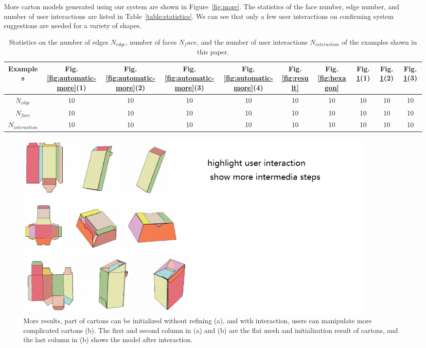 More carton models generated using our system are shown in Figure~\ref{fig:more}.
%
The statistics of the face number, edge number, and number of user interactions are listed in Table~\ref{table:statistics}. 
We can see that only a few user interactions on confirming system suggestions are needed for a variety of shapes.


\begin{table}
	\centering
	\caption{Statistics on the number of edges $N_{edge}$, number of faces $N_face$, and the number of user interactions $N_{interaction}$ of the examples shown in this paper.}
	\begin{tabular}{c|ccccccccc}
		\hline
		Examples & Fig.\ref{fig:automatic-more}(1) & Fig.\ref{fig:automatic-more}(2) &  Fig.\ref{fig:automatic-more}(3) & Fig.\ref{fig:automatic-more}(4) & Fig.\ref{fig:result} & Fig.\ref{fig:hexagon} & Fig.\ref{fig:result-more}(1) & Fig.\ref{fig:result-more}(2)& Fig.\ref{fig:result-more}(3)\\
		\hline
		$N_{edge}$ & 10 & 10 & 10 & 10 & 10 & 10 & 10 & 10 & 10 \\
		$N_{face}$  & 10 & 10 & 10 & 10 & 10 & 10 & 10 & 10 & 10 \\
		$N_{interaction}$  & 10 & 10 & 10 & 10 & 10 & 10 & 10 & 10 & 10\\
		\hline
		\end{tabular}
\end{table}



\begin{figure}
	\centering
	\includegraphics[width=0.9\textwidth]{images/interactiveresults-more.png}
	\caption{More results, part of cartons can be initialized without refining (a), and with interaction, users can manipulate more complicated cartons (b). The first and second column in (a) and (b) are the flat mesh and initialization result of cartons, and the last column in (b) shows the model after interaction.}
	\label{fig:result-more}
\end{figure}